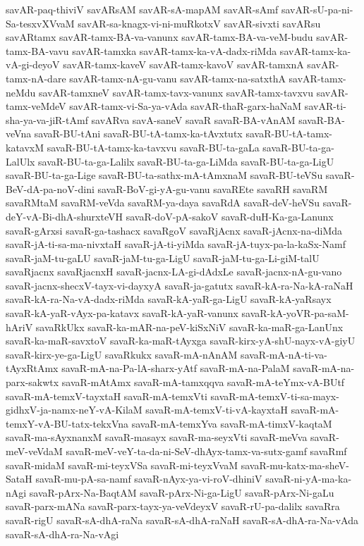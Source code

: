 {savAR-paq-thiviV
savARsAM
savAR-sA-mapAM
savAR-sAmf
savAR-sU-pa-ni-Sa-tesxvXVvaM
savAR-sa-knagx-vi-ni-muRkotxV
savAR-sivxti
savARsu
savARtamx
savAR-tamx-BA-va-vanunx
savAR-tamx-BA-va-veM-budu
savAR-tamx-BA-vavu
savAR-tamxka
savAR-tamx-ka-vA-dadx-riMda
savAR-tamx-ka-vA-gi-deyoV
savAR-tamx-kaveV
savAR-tamx-kavoV
savAR-tamxnA
savAR-tamx-nA-dare
savAR-tamx-nA-gu-vanu
savAR-tamx-na-satxthA
savAR-tamx-neMdu
savAR-tamxneV
savAR-tamx-tavx-vanunx
savAR-tamx-tavxvu
savAR-tamx-veMdeV
savAR-tamx-vi-Sa-ya-vAda
savAR-thaR-garx-haNaM
savAR-ti-sha-ya-va-jiR-tAmf
savARva
savA-saneV
savaR
savaR-BA-vAnAM
savaR-BA-veVna
savaR-BU-tAni
savaR-BU-tA-tamx-ka-tAvxtutx
savaR-BU-tA-tamx-katavxM
savaR-BU-tA-tamx-ka-tavxvu
savaR-BU-ta-gaLa
savaR-BU-ta-ga-LalUlx
savaR-BU-ta-ga-Lalilx
savaR-BU-ta-ga-LiMda
savaR-BU-ta-ga-LigU
savaR-BU-ta-ga-Lige
savaR-BU-ta-sathx-mA-tAmxnaM
savaR-BU-teVSu
savaR-BeV-dA-pa-noV-dini
savaR-BoV-gi-yA-gu-vanu
savaREte
savaRH
savaRM
savaRMtaM
savaRM-veVda
savaRM-ya-daya
savaRdA
savaR-deV-heVSu
savaR-deY-vA-Bi-dhA-shurxteVH
savaR-doV-pA-sakoV
savaR-duH-Ka-ga-Lanunx
savaR-gArxsi
savaR-ga-tashacx
savaRgoV
savaRjAcnx
savaR-jAcnx-na-diMda
savaR-jA-ti-sa-ma-nivxtaH
savaR-jA-ti-yiMda
savaR-jA-tuyx-pa-la-kaSx-Namf
savaR-jaM-tu-gaLU
savaR-jaM-tu-ga-LigU
savaR-jaM-tu-ga-Li-giM-talU
savaRjacnx
savaRjacnxH
savaR-jacnx-LA-gi-dAdxLe
savaR-jacnx-nA-gu-vano
savaR-jacnx-shecxV-tayx-vi-dayxyA
savaR-ja-gatutx
savaR-kA-ra-Na-kA-raNaH
savaR-kA-ra-Na-vA-dadx-riMda
savaR-kA-yaR-ga-LigU
savaR-kA-yaRsayx
savaR-kA-yaR-vAyx-pa-katavx
savaR-kA-yaR-vanunx
savaR-kA-yoVR-pa-saM-hAriV
savaRkUkx
savaR-ka-mAR-na-peV-kiSxNiV
savaR-ka-maR-ga-LanUnx
savaR-ka-maR-savxtoV
savaR-ka-maR-tAyxga
savaR-kirx-yA-shU-nayx-vA-giyU
savaR-kirx-ye-ga-LigU
savaRkukx
savaR-mA-nAnAM
savaR-mA-nA-ti-va-tAyxRtAmx
savaR-mA-na-Pa-lA-sharx-yAtf
savaR-mA-na-PalaM
savaR-mA-na-parx-sakwtx
savaR-mAtAmx
savaR-mA-tamxqqva
savaR-mA-teYmx-vA-BUtf
savaR-mA-temxV-tayxtaH
savaR-mA-temxVti
savaR-mA-temxV-ti-sa-mayx-gidhxV-ja-namx-neY-vA-KilaM
savaR-mA-temxV-ti-vA-kayxtaH
savaR-mA-temxY-vA-BU-tatx-tekxVna
savaR-mA-temxYva
savaR-mA-timxV-kaqtaM
savaR-ma-sAyxnanxM
savaR-masayx
savaR-ma-seyxVti
savaR-meVva
savaR-meV-veVdaM
savaR-meV-veY-ta-da-ni-SeV-dhAyx-tamx-va-sutx-gamf
savaRmf
savaR-midaM
savaR-mi-teyxVSa
savaR-mi-teyxVvaM
savaR-mu-katx-ma-sheV-SataH
savaR-mu-pA-sa-namf
savaR-nAyx-ya-vi-roV-dhiniV
savaR-ni-yA-ma-ka-nAgi
savaR-pArx-Na-BaqtAM
savaR-pArx-Ni-ga-LigU
savaR-pArx-Ni-gaLu
savaR-parx-mANa
savaR-parx-tayx-ya-veVdeyxV
savaR-rU-pa-dalilx
savaRra
savaR-rigU
savaR-sA-dhA-raNa
savaR-sA-dhA-raNaH
savaR-sA-dhA-ra-Na-vAda
savaR-sA-dhA-ra-Na-vAgi
}
